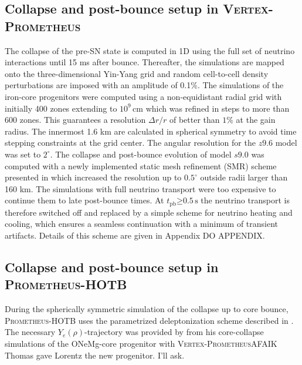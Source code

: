 \documentclass[fleqn,usenatbib]{mnras}
\newcommand{\tpb}{\ensuremath{t_{\text{pb}}}}
\newcommand{\s}{\ensuremath{\text{s}}}
\newcommand{\prom}{\textsc{Prometheus-HOTB}\xspace}
\newcommand{\vertexprom}{\textsc{Vertex-Prometheus}\xspace}
\newcommand{\GEO}[1]{{\color{red}#1}}
\newcommand{\COM}[1]{{\color{orange}#1}}
\begin{document}
\subsection{Collapse and post-bounce setup in \vertexprom}
\label{sec:Collapse and post-bounce setup in vertexprom}
The collapse of the pre-SN state is computed in 1D using the full set of neutrino interactions until 15 ms after bounce. Thereafter, the simulations are mapped onto the three-dimensional Yin-Yang grid and random cell-to-cell density perturbations are imposed with an amplitude of 0.1\%. 
The simulations of the iron-core progenitors were computed using a non-equidistant radial grid with initially 400 zones extending to $10^9\,\text{cm}$ which was refined in steps to more than 600 zones. This guarantees a resolution $\Delta r/r$ of better than $1\%$ at the gain radius. The innermost 1.6 km are calculated in spherical symmetry to avoid time stepping constraints at the grid center.
The angular resolution for the $z9.6$ model was set to $2^{\circ}$. 
The collapse and post-bounce evolution of model $s9.0$ was computed with a newly implemented static mesh refinement (SMR) scheme presented in \cite{Melson2019} which increased the resolution up to $0.5^{\circ}$ \GEO{outside radii larger than 160 km}.
\GEO{The simulations with full neutrino transport were too expensive to continue them to late post-bounce times. At $\tpb \mathord{\ge} 0.5\,\s$ the neutrino transport is therefore switched off and replaced by a simple scheme for neutrino heating and cooling, which ensures a seamless continuation with a minimum of transient artifacts. Details of this scheme are given in Appendix \COM{DO APPENDIX}.}

\subsection{Collapse and post-bounce setup in \prom}
\label{sec:Collapse and post-bounce setup in prom}
During the spherically symmetric simulation of the collapse up to core bounce, \prom uses the parametrized deleptonization scheme described in \citet{Liebendoerfer2005}. The necessary $Y_{e}(\rho)$-trajectory was provided by \cite{Huedepohl2018} from his core-collapse simulations of the ONeMg-core progenitor with \vertexprom \COM{AFAIK Thomas gave Lorentz the new progenitor. I'll ask}.
\end{document}
